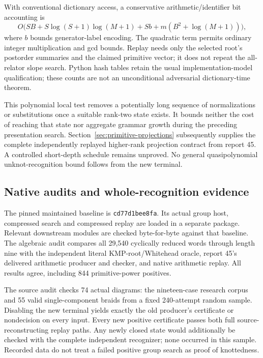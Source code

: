 With conventional dictionary access, a conservative arithmetic/identifier
bit accounting is
\[
 O\bigl(SB+S\log(S+1)\log(M+1)+Sb
        +m(B^2+\log(M+1))\bigr),
\]
where $b$ bounds generator-label encoding. The quadratic term permits
ordinary integer multiplication and gcd bounds. Replay needs only the
selected root's postorder summaries and the claimed primitive vector;
it does not repeat the all-relator slope search. Python hash tables retain
the usual implementation-model qualification; these counts are not an
unconditional adversarial dictionary-time theorem.

This polynomial local test removes a potentially long sequence of
normalizations or substitutions once a suitable rank-two state exists.
It bounds neither the cost of reaching that state nor aggregate grammar
growth during the preceding presentation search. Section~\ref{sec:primitive-projections} subsequently supplies the complete
independently replayed higher-rank projection contract from report 45.
A controlled short-depth schedule remains unproved. No general quasipolynomial
unknot-recognition bound follows from the new terminal.

\subsection{Native audits and whole-recognition evidence}

The pinned maintained baseline is \texttt{cd77d1bee8fa}. Its actual group
host, compressed search and compressed replay are loaded in a separate
package. Relevant downstream modules are checked byte-for-byte against
that baseline. The algebraic audit compares all 29,540 cyclically reduced
words through length nine with the independent literal KMP-root/Whitehead
oracle, report 45's delivered arithmetic producer and checker, and native
arithmetic replay. All results agree, including 844 primitive-power
positives.

The source audit checks 74 actual diagrams: the nineteen-case research
corpus and 55 valid single-component braids from a fixed 240-attempt random
sample. Disabling the new terminal yields exactly the old producer's
certificate or nondecision on every input. Every new positive certificate
passes both full source-reconstructing replay paths. Any newly closed
state would additionally be checked with the complete independent
recognizer; none occurred in this sample. Recorded data do not treat a
failed positive group search as proof of knottedness.

